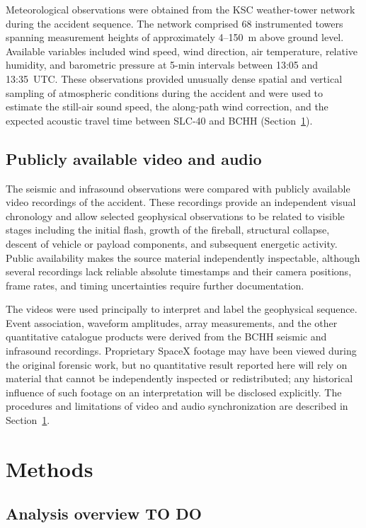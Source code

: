 \documentclass[]{seismica}
\begin{document}
Meteorological observations were obtained from the KSC weather-tower network
during the accident sequence. The network comprised 68 instrumented towers
spanning measurement heights of approximately 4--150~m above ground level.
Available variables included wind speed, wind direction, air temperature,
relative humidity, and barometric pressure at 5-min intervals between 13:05
and 13:35~UTC. These observations provided unusually dense spatial and vertical
sampling of atmospheric conditions during the accident and were used to
estimate the still-air sound speed, the along-path wind correction, and the
expected acoustic travel time between SLC-40 and BCHH
(Section~\ref{sec:methods}).


\subsection{Publicly available video and audio}

The seismic and infrasound observations were compared with publicly available
video recordings of the accident. These recordings provide an independent
visual chronology and allow selected geophysical observations to be related to
visible stages including the initial flash, growth of the fireball, structural
collapse, descent of vehicle or payload components, and subsequent energetic
activity. Public availability makes the source material independently
inspectable, although several recordings lack reliable absolute timestamps and
their camera positions, frame rates, and timing uncertainties require further
documentation.

The videos were used principally to interpret and label the geophysical
sequence. Event association, waveform amplitudes, array measurements, and the
other quantitative catalogue products were derived from the BCHH seismic and
infrasound recordings. Proprietary SpaceX footage may have been viewed during
the original forensic work, but no quantitative result reported here will rely
on material that cannot be independently inspected or redistributed; any
historical influence of such footage on an interpretation will be disclosed
explicitly. The procedures and limitations of video and audio
synchronization are described in Section~\ref{sec:methods}.


\section{Methods}
\label{sec:methods}

\subsection{Analysis overview TO DO}
\end{document}
